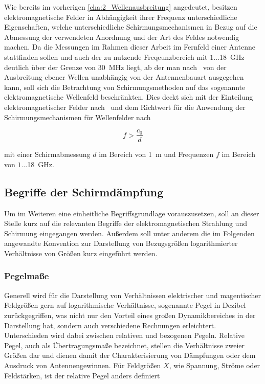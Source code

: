 Wie bereits im vorherigen \Abschnitt \ref{cha:2_Wellenausbreitung} angedeutet, besitzen elektromagnetische Felder in Abhängigkeit ihrer Frequenz unterschiedliche Eigenschaften, welche unterschiedliche Schirmungsmechanismen in Bezug auf die Abmessung der verwendeten Anordnung und der Art des Feldes notwendig machen. Da die Messungen im Rahmen dieser Arbeit im Fernfeld einer Antenne stattfinden sollen und auch der zu nutzende Freqeunzbereich mit $1\ldots$\SI{18}{\giga\hertz} deutlich über der Grenze von \SI{30}{\mega\hertz} liegt, ab der man nach~\cite{Design_of_shielded_enclosures} von der Ausbreitung ebener Wellen unabhängig von der Antennenbauart ausgegehen kann, soll sich die Betrachtung von Schirmungsmethoden auf das sogenannte elektromagnetische Wellenfeld beschränkten. Dies deckt sich mit der Einteilung elektromagnetischer Felder nach~\cite{Feldtheorie_Begriffe} und dem Richtwert für die Anwendung der Schirmungsmechanismen für Wellenfelder nach~\cite{EM_Schirmung}

\begin{equation}
    f > \frac{c_0}{d}
\end{equation}

mit einer Schirmabmessung $d$ im Bereich von \SI{1}{\meter} und Frequenzen $f$ im Bereich von $1\ldots$\SI{18}{\giga\hertz}.




\subsection{Begriffe der Schirmdämpfung}\label{cha:2_sub_Begriff_der_Schirmdaempfung}

Um im Weiteren eine einheitliche Begriffsgrundlage vorauszusetzen, soll an dieser Stelle kurz auf die relevanten Begriffe der elektromagnetischen Strahlung und Schirmung eingegangen werden. Außerdem soll unter anderem die im Folgenden angewandte Konvention zur Darstellung von Bezugsgrößen logarithmierter Verhältnisse von Größen kurz eingeführt werden. 

\subsubsection{Pegelmaße}

Generell wird für die Darstellung von Verhältnissen elektrischer und magentischer Feldgrößen gern auf logarithmische Verhältnisse, sogenannte Pegel in Dezibel zurückgegriffen, was nicht nur den Vorteil eines großen Dynamikbereiches in der Darstellung hat, sondern auch verschiedene Rechnungen erleichtert. Unterschieden wird dabei zwischen relativen und bezogenen Pegeln. Relative Pegel, auch als Übertragungsmaße bezeichnet, stellen die Verhältnisse zweier Größen dar und dienen damit der Charakterisierung von Dämpfungen oder dem Ausdruck von Antennengewinnen. Für Feldgrößen $X$, wie Spannung, Ströme oder Feldstärken, ist der relative Pegel anders definiert~\cite{EM_Schirmung}


